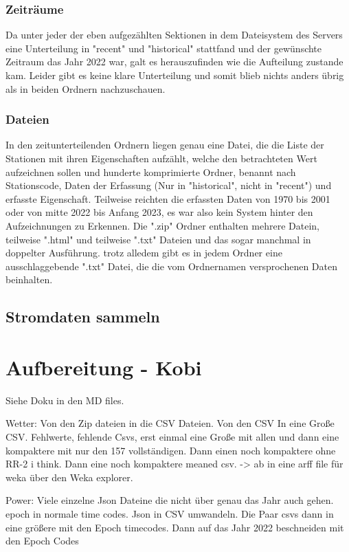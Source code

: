 \documentclass[letterpaper]{article} %
\begin{document}
            \subsubsection*{Zeiträume}
                Da unter jeder der eben aufgezählten Sektionen in dem Dateisystem des Servers eine Unterteilung in "recent" und "historical" stattfand und der gewünschte Zeitraum das Jahr 2022 war, galt es herauszufinden wie die Aufteilung zustande kam. Leider gibt es keine klare Unterteilung und somit blieb nichts anders übrig als in beiden Ordnern nachzuschauen.
            \subsubsection*{Dateien}
                In den zeitunterteilenden Ordnern liegen genau eine Datei, die die Liste der Stationen mit ihren Eigenschaften aufzählt, welche den betrachteten Wert aufzeichnen sollen und hunderte komprimierte Ordner, benannt nach Stationscode, Daten der Erfassung (Nur in "historical", nicht in "recent") und erfasste Eigenschaft. Teilweise reichten die erfassten Daten von 1970 bis 2001 oder von mitte 2022 bis Anfang 2023, es war also kein System hinter den Aufzeichnungen zu Erkennen.
                Die ".zip" Ordner enthalten mehrere Datein, teilweise ".html" und teilweise ".txt" Dateien und das sogar manchmal in doppelter Ausführung. trotz alledem gibt es in jedem Ordner eine ausschlaggebende ".txt" Datei, die die vom Ordnernamen versprochenen Daten beinhalten.
        
        

    \subsection*{Stromdaten sammeln}


\section*{Aufbereitung - Kobi}
    Siehe Doku in den MD files.
    
    Wetter: Von den Zip dateien in die CSV Dateien. Von den CSV In eine Große CSV. Fehlwerte, fehlende Csvs, erst einmal eine Große mit allen und dann eine kompaktere mit nur den 157 vollständigen. Dann einen  noch kompaktere ohne RR-2 i think. Dann eine noch kompaktere meaned csv. -> ab in eine arff file für weka über den Weka explorer.

    Power: Viele einzelne Json Dateine die nicht über genau das Jahr auch gehen. epoch in normale time codes. Json in CSV umwandeln. Die Paar csvs dann in eine größere mit den Epoch timecodes. Dann auf das Jahr 2022 beschneiden mit den Epoch Codes
\end{document}

